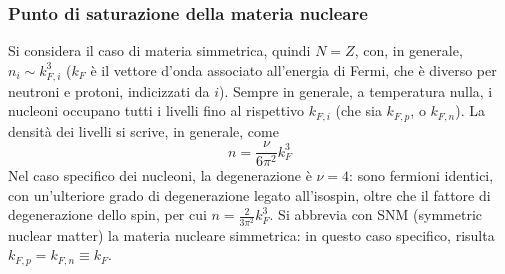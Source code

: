 \documentclass[11pt, a4paper]{scrartcl}
\theoremstyle{style}
\numberwithin{equation}{subsection}
\begin{document}
\subsubsection{Punto di saturazione della materia nucleare}

Si considera il caso di materia simmetrica, quindi $N=Z$, con, in generale, $n_i \sim k_{F,i}^3$ ($k_F$ \`e il vettore d'onda associato all'energia di Fermi, che \`e diverso per neutroni e protoni, indicizzati da $i$).
Sempre in generale, a temperatura nulla, i nucleoni occupano tutti i livelli fino al rispettivo $k_{F,i}$ (che sia $k_{F,p}$, o $k_{F,n}$).
La densit\`a dei livelli si scrive, in generale, come
\[
n = \frac{\nu }{6 \pi ^2} k_F ^3
\] 
Nel caso specifico dei nucleoni, la degenerazione \`e $\nu  = 4$: sono fermioni identici, con un'ulteriore grado di degenerazione legato all'isospin, oltre che il fattore di degenerazione dello spin, per cui $n = \frac{2}{3\pi^2}k_F^3$.
Si abbrevia con SNM (symmetric nuclear matter) la materia nucleare simmetrica: in questo caso specifico, risulta $k_{F,p} = k_{F,n} \equiv k_F$.
\end{document}
